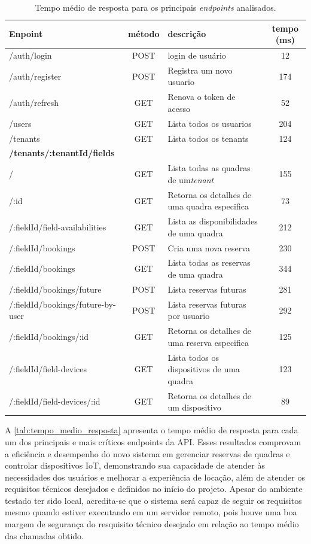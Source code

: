 \begin{table}[htb]
  \centering
  \caption{\label{tab:tempo_medio_resposta}Tempo médio de resposta para os principais \textit{endpoints} analisados.}
  \begin{tabular}{|m{6cm}|c|p{4cm}|c|}
  \hline
  \textbf{Enpoint} & \textbf{método} & \textbf{descrição} & \textbf{tempo (ms)} \\ \hline
  /auth/login & POST & login de usuário & 12 \\ \hline
  /auth/register & POST & Registra um novo usuario & 174 \\ \hline
  /auth/refresh & GET & Renova o token de acesso & 52 \\ \hline
  /users & GET & Lista todos os usuarios & 204 \\ \hline
  /tenants & GET & Lista todos os tenants & 124 \\ \hline
  \textbf{/tenants/:tenantId/fields} & & & \\ \hline
  / & GET & Lista todas as quadras de um\textit{tenant}& 155 \\ \hline
  /:id & GET & Retorna os detalhes de uma quadra especifica & 73 \\ \hline
  /:fieldId/field-availabilities & GET & Lista as disponibilidades de uma quadra & 212 \\ \hline
  /:fieldId/bookings & POST & Cria uma nova reserva & 230 \\ \hline
  /:fieldId/bookings & GET & Lista todas as reservas de uma quadra & 344 \\ \hline
  /:fieldId/bookings/future & POST & Lista reservas futuras & 281 \\ \hline
  /:fieldId/bookings/future-by-user & POST & Lista reservas futuras por usuario & 292 \\ \hline
  /:fieldId/bookings/:id & GET & Retorna os detalhes de uma reserva especifica & 125 \\ \hline
  /:fieldId/field-devices & GET & Lista todos os dispositivos de uma quadra & 123 \\ \hline
  /:fieldId/field-devices/:id & GET & Retorna os detalhes de um dispositivo & 89 \\ \hline
  \end{tabular}
\end{table}

A \autoref{tab:tempo_medio_resposta} apresenta o tempo médio de resposta para cada um dos principais e mais críticos endpoints da \acrshort{API}. Esses resultados comprovam a eficiência e desempenho do novo sistema em gerenciar reservas de quadras e controlar dispositivos IoT, demonstrando sua capacidade de atender às necessidades dos usuários e melhorar a experiência de locação, além de atender os requisitos técnicos desejados e definidos no início do projeto. Apesar do ambiente testado ter sido local, acredita-se que o sistema será capaz de seguir os requisitos mesmo quando estiver executando em um servidor remoto, pois houve uma boa margem de segurança do resquisito técnico desejado em relação ao tempo médio das chamadas obtido.

